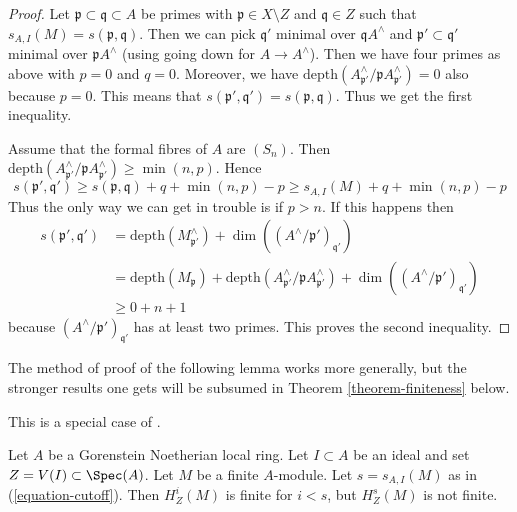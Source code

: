 \begin{proof}
\medskip\noindent
Let $\mathfrak p \subset \mathfrak q \subset A$ be primes
with $\mathfrak p \in X \setminus Z$ and $\mathfrak q \in Z$ such that
$s_{A, I}(M) = s(\mathfrak p, \mathfrak q)$.
Then we can pick $\mathfrak q'$ minimal over $\mathfrak q A^\wedge$
and $\mathfrak p' \subset \mathfrak q'$ minimal over
$\mathfrak p A^\wedge$ (using going down for $A \to A^\wedge$).
Then we have four primes as above with $p = 0$ and $q = 0$.
Moreover, we have
$\text{depth}(A^\wedge_{\mathfrak p'} / \mathfrak p A^\wedge_{\mathfrak p'})=0$
also because $p = 0$. This means that
$s(\mathfrak p', \mathfrak q') = s(\mathfrak p, \mathfrak q)$.
Thus we get the first inequality.

\medskip\noindent
Assume that the formal fibres of $A$ are $(S_n)$. Then
$\text{depth}(A^\wedge_{\mathfrak p'} / \mathfrak p A^\wedge_{\mathfrak p'})
\geq \min(n, p)$.
Hence
$$
s(\mathfrak p', \mathfrak q') \geq
s(\mathfrak p, \mathfrak q) + q + \min(n, p) - p \geq
s_{A, I}(M) + q + \min(n, p) - p
$$
Thus the only way we can get in trouble is if $p > n$. If this happens
then
\begin{align*}
s(\mathfrak p', \mathfrak q')
& =
\text{depth}(M^\wedge_{\mathfrak p'}) +
\dim((A^\wedge/\mathfrak p')_{\mathfrak q'}) \\
& =
\text{depth}(M_\mathfrak p) +
\text{depth}(A^\wedge_{\mathfrak p'} / \mathfrak p A^\wedge_{\mathfrak p'}) +
\dim((A^\wedge/\mathfrak p')_{\mathfrak q'}) \\
& \geq
0 + n + 1
\end{align*}
because $(A^\wedge/\mathfrak p')_{\mathfrak q'}$ has at least two primes.
This proves the second inequality.
\end{proof}

\noindent
The method of proof of the following lemma works more generally,
but the stronger results one gets will be subsumed in
Theorem \ref{theorem-finiteness} below.

\begin{lemma}
\label{lemma-local-annihilator}
\begin{reference}
This is a special case of
\cite[Satz 1]{Faltings-annulators}.
\end{reference}
Let $A$ be a Gorenstein Noetherian local ring. Let $I \subset A$
be an ideal and set $Z = V(I) \subset \Spec(A)$.
Let $M$ be a finite $A$-module. Let $s = s_{A, I}(M)$ as in
(\ref{equation-cutoff}). Then $H^i_Z(M)$ is finite for $i < s$,
but $H^s_Z(M)$ is not finite.
\end{lemma}

